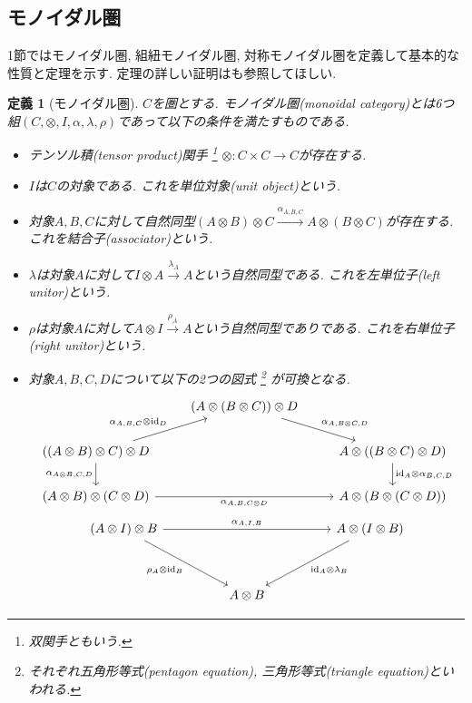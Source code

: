 \documentclass[a4paper,12pt]{ltjsarticle}
\theoremstyle{break}
\newtheorem{defn}[thm]{定義}
\newcommand{\xr}[1]{\xrightarrow{#1}}
\newcommand{\id}{\mathrm{id}}
\newcommand{\al}{\alpha}
\newcommand{\la}{\lambda}
\newcommand{\ot}{\otimes}
\newcommand{\ti}{\times}
\numberwithin{equation}{section}
\begin{document}
\subsection{モノイダル圏}
1節ではモノイダル圏, 組紐モノイダル圏, 対称モノイダル圏を定義して基本的な性質と定理を示す. 
定理の詳しい証明は\cite{CWM}も参照してほしい. 

\begin{defn}[モノイダル圏]
  $C$を圏とする. 
  モノイダル圏(monoidal category)とは6つ組$(C,\ot, I, \al, \la, \rho)$であって以下の条件を満たすものである. 
  \begin{itemize}
    \item テンソル積(tensor product)関手
    \footnote{
    双関手ともいう. 
    }
    $\ot: C \ti C \to C$が存在する. 
    \item $I$は$C$の対象である. これを単位対象(unit object)という. 
    \item 対象$A, B, C$に対して自然同型$(A \ot B) \ot C \xr{\al_{A,B,C}} A \ot (B \ot C)$が存在する. 
    これを結合子(associator)という. 
    \item $\la$は対象$A$に対して$I \ot A \xr{\la_A} A$という自然同型である. 
    これを左単位子(left unitor)という. 
    \item $\rho$は対象$A$に対して$A \ot I \xr{\rho_A} A$という自然同型でありである. 
    これを右単位子(right unitor)という. 
    \item 対象$A, B, C, D$について以下の2つの図式
      \footnote{
      それぞれ五角形等式(pentagon equation), 三角形等式(triangle equation)といわれる. 
      }
      が可換となる. 
    \[\begin{tikzcd}
      & {(A \ot (B \ot C)) \ot D} \\
      {((A \ot B) \ot C) \ot D} && {A \ot ((B \ot C) \ot D)} \\
      {(A \ot B) \ot (C \ot D)} && {A \ot (B \ot (C \ot D))}
      \arrow["{\al_{A, B, C} \ot \id_D}", from=2-1, to=1-2]
      \arrow["{\al_{A \ot B, C, D}}"', from=2-1, to=3-1]
      \arrow["{\al_{A, B, C \ot D}}"', from=3-1, to=3-3]
      \arrow["{\al_{A, B \ot C, D}}", from=1-2, to=2-3]
      \arrow["{\id_A \ot \al_{B, C ,D}}", from=2-3, to=3-3]
    \end{tikzcd}\]
    \[\begin{tikzcd}
      {(A \ot I) \ot B} &&&& {A \ot (I \ot B)} \\
      \\
      && {A \ot B}
      \arrow["{\al_{A, I, B}}", from=1-1, to=1-5]
      \arrow["{\rho_A \ot \id_B}"', from=1-1, to=3-3]
      \arrow["{\id_A \ot \la_B}", from=1-5, to=3-3]
    \end{tikzcd}\]
  \end{itemize}
\end{defn}
\end{document}
